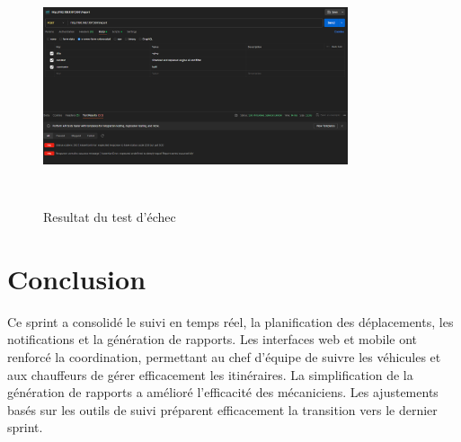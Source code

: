 \begin{figure}[h!]
    \centering
    \includegraphics[width=0.8\textwidth, height=7cm]{chap5.images/fail sprint 3.png}
    \caption{ Resultat du test d'échec }

\end{figure}
\newpage
\section*{Conclusion}
\bigskip
\begin{sloppypar}
    Ce sprint a consolidé le suivi en temps réel, la planification des déplacements, les notifications et la génération de rapports. Les interfaces web et mobile ont renforcé la coordination, permettant au chef d'équipe de suivre les véhicules et aux chauffeurs de gérer efficacement les itinéraires. La simplification de la génération de rapports a amélioré l'efficacité des mécaniciens. Les ajustements basés sur les outils de suivi préparent efficacement la transition vers le dernier sprint.
\end{sloppypar}




